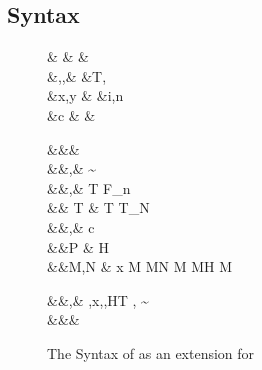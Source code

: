 \documentclass[screen,nonacm,manuscript,review]{acmart} %
\begin{document}
\subsection{Syntax}\label{sec:sfp-syntax}
\begin{figure}[ht]
 \centering
 \begin{syntax}
  & &  & \\
  &\TyVar,\beta,\Co &\qquad{} &T, \\
  &x,y &\qquad{} &i,n \in {} \\
  &c & &
 \end{syntax}
 \begin{syntax}
  &&\square & \\
  &&\kappa,\eta \bnfeq& \STAR \bnfor
                                  \kappa \to \kappa \bnfor \sigma\sim\tau \bnfor \shl{\chi} \bnfor {}\\
  &&\tau,\sigma \bnfeq& \TyVar \bnfor T
                                  \bnfor \tau \to \tau \bnfor
                                  \tau\App\tau \bnfor \Forall {\TyVar\co\kappa} \tau  \bnfor F_n
                                  \bnfor \shl{\Forall \chi \tau} \bnfor \shl{\tau\App\kappa} \bnfor {}\\
  && T \bnfeq& T \bnfor T_N\\
  &&\nu,\Co \bnfeq& c \bnfor {}\tau \bnfor \Sym\Co \bnfor \trans\nu\Co %
 \bnfor \Forall {\TyVar\co\kappa} \Co \bnfor \Co\At\tau %
 \bnfor \nu\App\Co \bnfor \Left \Co \bnfor \Right \Co  %
 \bnfor \shl{\Forall \chi \Co} \bnfor \shl{\Co\App\chi} %
 \bnfor \shl{\Co\At\chi}\\
  &&P \bnfeq& H \App\shl{\many\chi}\App\many{\TyVar\co\kappa} \\
  &&M,N \bnfeq& x \bnfor {} M \bnfor M\App N \bnfor \TLam{\tau\co\kappa} M \bnfor M\App \tau \bnfor H \bnfor \Case M  \bnfor \Cast \Tm \Co %
 \bnfor \shl{\TLam \chi \Tm} \bnfor \shl{\Tm\App\kappa} \\

 \end{syntax}
 \begin{syntax}
  &&\TEnv,\Delta \bnfeq& \empt \bnfor \TEnv,x\co\tau \bnfor \TEnv,\TyVar\co\kappa \bnfor \TEnv,H\co T \bnfor \TEnv, \Co \co \tau\sim\sigma\\
  &&\Subst \bnfeq& \empt \bnfor \Set{\many{\TyVar \mapsto \tau}}
 \end{syntax}
 \caption{The Syntax of \SFP as an extension for \SFC}
 \label{fig:sfp-syntax}
\end{figure}
\end{document}
